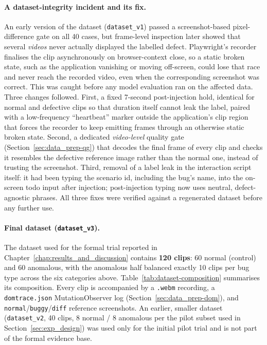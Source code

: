 \paragraph{A dataset-integrity incident and its fix.} An early version of the dataset (\texttt{dataset\_v1}) passed a screenshot-based pixel-difference gate on all 40 cases, but frame-level inspection later showed that several \emph{videos} never actually displayed the labelled defect. Playwright's recorder finalises the clip asynchronously on browser-context close, so a static broken state, such as the application vanishing or moving off-screen, could lose that race and never reach the recorded video, even when the corresponding screenshot was correct. This was caught before any model evaluation ran on the affected data. Three changes followed. First, a fixed 7-second post-injection hold, identical for normal and defective clips so that duration itself cannot leak the label, paired with a low-frequency ``heartbeat'' marker outside the application's clip region that forces the recorder to keep emitting frames through an otherwise static broken state. Second, a dedicated \emph{video-level} quality gate (Section~\ref{sec:data_prep-qg}) that decodes the final frame of every clip and checks it resembles the defective reference image rather than the normal one, instead of trusting the screenshot. Third, removal of a label leak in the interaction script itself: it had been typing the scenario id, including the bug's name, into the on-screen todo input after injection; post-injection typing now uses neutral, defect-agnostic phrases. All three fixes were verified against a regenerated dataset before any further use.

\paragraph{Final dataset (\texttt{dataset\_v3}).} The dataset used for the formal trial reported in Chapter~\ref{chap:results_and_discussion} contains \textbf{120 clips}: 60 normal (control) and 60 anomalous, with the anomalous half balanced exactly 10 clips per bug type across the six categories above. Table~\ref{tab:dataset-composition} summarises its composition. Every clip is accompanied by a \texttt{.webm} recording, a \texttt{domtrace.json} MutationObserver log (Section~\ref{sec:data_prep-dom}), and \texttt{normal}/\texttt{buggy}/\texttt{diff} reference screenshots. An earlier, smaller dataset (\texttt{dataset\_v2}, 40 clips, 8 normal / 8 anomalous per the pilot subset used in Section~\ref{sec:exp_design}) was used only for the initial pilot trial and is not part of the formal evidence base.

